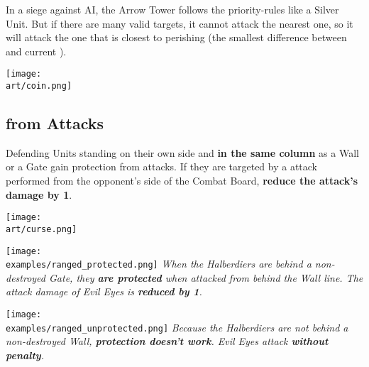 \begin{multicols*}{2}
In a siege against AI, the Arrow Tower follows the priority-rules like a Silver  Unit. But if there are many valid targets, it cannot attack the nearest one, so it will attack the one that is closest to perishing (the smallest difference between  and current ).

\vspace*{\fill}
\begin{center}
  \texttt{[image: \\art/coin.png]}
\end{center}
\end{multicols*}

\newpage
\begin{multicols}{2}
\subsection*{ from  Attacks}

Defending Units standing on their own side and \textbf{in the same column} as a Wall or a Gate gain protection from  attacks.
If they are targeted by a  attack performed from the opponent's side of the Combat Board, \textbf{reduce the attack's damage by 1}.
\vspace*{\fill}

\begin{center}
  \texttt{[image: \\art/curse.png]}
\end{center}
\end{multicols}

\begin{multicols}{2}
\vspace*{\fill}
\texttt{[image: \\examples/ranged\_protected.png]}
{\textit{When the Halberdiers are behind a non-destroyed Gate, they \textbf{are protected} when attacked from behind the Wall line.
  The  attack damage of Evil Eyes is \textbf{reduced by 1}.}}
\columnbreak

\vspace*{\fill}
\texttt{[image: \\examples/ranged\_unprotected.png]}
{\textit{Because the Halberdiers are not behind a non-destroyed Wall, \textbf{protection doesn't work}.
  Evil Eyes attack \textbf{without penalty}.}}
\newline\newline
\end{multicols}
\newpage

